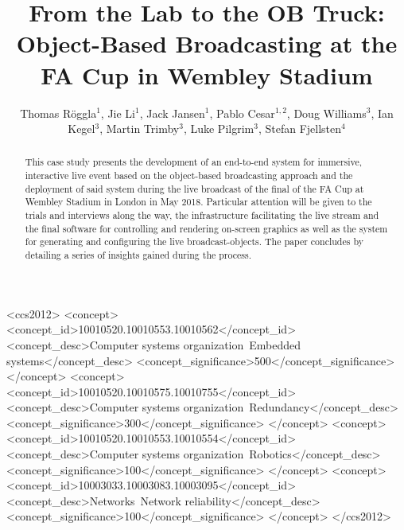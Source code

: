 \documentclass[sigchi-a, authorversion]{acmart}
\begin{document}
\title{From the Lab to the OB Truck: Object-Based Broadcasting at the FA Cup in Wembley Stadium}

\author{Thomas R\"{o}ggla$^1$, Jie Li$^1$, Jack Jansen$^1$, Pablo Cesar$^{1,2}$, Doug Williams$^3$, Ian Kegel$^3$, Martin Trimby$^3$, Luke Pilgrim$^3$, Stefan Fjellsten$^4$}


\renewcommand{\shortauthors}{T. R\"{o}ggla et al.}


%
%
\begin{CCSXML}
<ccs2012>
 <concept>
  <concept_id>10010520.10010553.10010562</concept_id>
  <concept_desc>Computer systems organization~Embedded systems</concept_desc>
  <concept_significance>500</concept_significance>
 </concept>
 <concept>
  <concept_id>10010520.10010575.10010755</concept_id>
  <concept_desc>Computer systems organization~Redundancy</concept_desc>
  <concept_significance>300</concept_significance>
 </concept>
 <concept>
  <concept_id>10010520.10010553.10010554</concept_id>
  <concept_desc>Computer systems organization~Robotics</concept_desc>
  <concept_significance>100</concept_significance>
 </concept>
 <concept>
  <concept_id>10003033.10003083.10003095</concept_id>
  <concept_desc>Networks~Network reliability</concept_desc>
  <concept_significance>100</concept_significance>
 </concept>
</ccs2012>
\end{CCSXML}



\begin{abstract}
This case study presents the development of an end-to-end system for
immersive, interactive live event based on the object-based broadcasting
approach and the deployment of said system during the live
broadcast of the final of the FA Cup at Wembley Stadium in London in May 2018. 
Particular attention will be given to the trials and interviews along the way,
the infrastructure facilitating the live stream and the final software for
controlling and rendering on-screen graphics as well as the system for generating
and configuring the live broadcast-objects. The paper concludes by detailing
a series of insights gained during the process.


\end{abstract}
\end{document}
